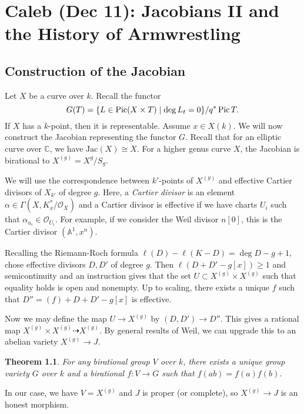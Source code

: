 \documentclass[leqno, openany]{memoir}
\newtheorem{thm}{Theorem}[section]
\theoremstyle{definition}
\theoremstyle{remark}
\theoremstyle{plain}
\theoremstyle{definition}
\theoremstyle{remark}
\newcommand{\A}{\mathbb{A}}
\newcommand{\C}{\mathbb{C}}
\newcommand{\mc}[1]{\mathcal{#1}}
\newcommand{\mr}[1]{\mathrm{#1}}
\DeclareMathOperator{\Pic}{Pic}
\begin{document}
\chapter{Caleb (Dec 11): Jacobians II and the History of Armwrestling}%
\label{cha:caleb_dec_11_jacobians_ii_and_the_history_of_armwrestling}

\section{Construction of the Jacobian}%
\label{sec:construction_of_the_jacobian}

Let $X$ be a curve over $k$. Recall the functor \[ G(T) = \qty{L \in \Pic(X
\times T) \mid \deg L_t = 0} / q^* \Pic T. \] If $X$ has a $k$-point, then it
is representable. Assume $x \in X(k)$. We will now construct the Jacobian
representing the functor $G$. Recall that for an elliptic curve over $\C$, we
have $\mr{Jac}(X) \cong X$. For a higher genus curve $X$, the Jacobian is
birational to $X^{(g)} = X^g / S_g$.

We will use the correspondence between $k'$-points of $X^{(g)}$ and effective
Cartier divisors of $X_{k'}$ of degree $g$. Here, a \textit{Cartier divisor} is
an element $\alpha \in \Gamma(X, K_x^* / \mc{O}_X)$ and a Cartier divisor is
effective if we have charts $U_i$ such that $\alpha_{u_i} \in \mc{O}_{U_i}$.
For example, if we consider the Weil divisor $n[0]$, this is the Cartier
divisor $(\A^1, x^n)$.

Recalling the Riemann-Roch formula $\ell(D) - \ell(K - D) = \deg D - g + 1$,
chose effective divisors $D, D'$ of degree $g$. Then $\ell(D+D' - g[x]) \geq 1$
and semicontinuity and an instruction gives that the set $U \subset X^{(g)}
\times X^{(g)}$ such that equality holds is open and nonempty. Up to scaling,
there exists a unique $f$ such that $D'' = (f) + D + D' - g[x]$ is effective.

Now we may define the map $U \to X^{(g)}$ by $(D, D') \to D''$. This gives a
rational map $X^{(g)} \times X^{(g)} \dashrightarrow X^{(g)}$. By general
results of Weil, we can upgrade this to an abelian variety $X^{(g)} \to J$.

\begin{thm} For any birational group $V$ over $k$, there exists a unique group
variety $G$ over $k$ and a birational $f \colon V \to G$ such that $f(ab) =
f(a) f(b)$.  \end{thm}

In our case, we have $V = X^{(g)}$ and $J$ is proper (or complete), so $X^{(g)}
\to J$ is an honest morphism. 
\end{document}
